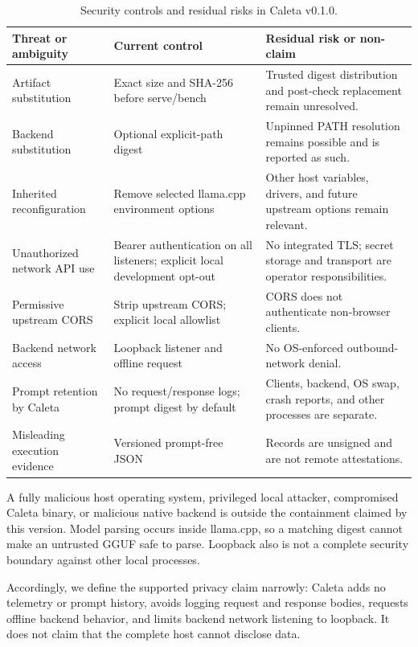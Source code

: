 \documentclass[11pt,a4paper]{article}
\newcommand{\softwareversion}{0.1.0}
\begin{document}
\begin{table}[ht]
\centering
\small
\begin{tabular}{>{\raggedright\arraybackslash}p{}>{\raggedright\arraybackslash}p{}>{\raggedright\arraybackslash}p{}}
\toprule
Threat or ambiguity & Current control & Residual risk or non-claim \\
\midrule
Artifact substitution & Exact size and SHA-256 before serve/bench & Trusted digest distribution and post-check replacement remain unresolved. \\
Backend substitution & Optional explicit-path digest & Unpinned PATH resolution remains possible and is reported as such. \\
Inherited reconfiguration & Remove selected llama.cpp environment options & Other host variables, drivers, and future upstream options remain relevant. \\
Unauthorized network API use & Bearer authentication on all listeners; explicit local development opt-out & No integrated TLS; secret storage and transport are operator responsibilities. \\
Permissive upstream CORS & Strip upstream CORS; explicit local allowlist & CORS does not authenticate non-browser clients. \\
Backend network access & Loopback listener and offline request & No OS-enforced outbound-network denial. \\
Prompt retention by Caleta & No request/response logs; prompt digest by default & Clients, backend, OS swap, crash reports, and other processes are separate. \\
Misleading execution evidence & Versioned prompt-free JSON & Records are unsigned and are not remote attestations. \\
\bottomrule
\end{tabular}
\caption{Security controls and residual risks in Caleta v\softwareversion.}
\label{tab:threats}
\end{table}

A fully malicious host operating system, privileged local attacker, compromised Caleta binary, or malicious native backend is outside the containment claimed by this version. Model parsing occurs inside llama.cpp, so a matching digest cannot make an untrusted GGUF safe to parse. Loopback also is not a complete security boundary against other local processes.

Accordingly, we define the supported privacy claim narrowly: Caleta adds no telemetry or prompt history, avoids logging request and response bodies, requests offline backend behavior, and limits backend network listening to loopback. It does not claim that the complete host cannot disclose data.
\end{document}
